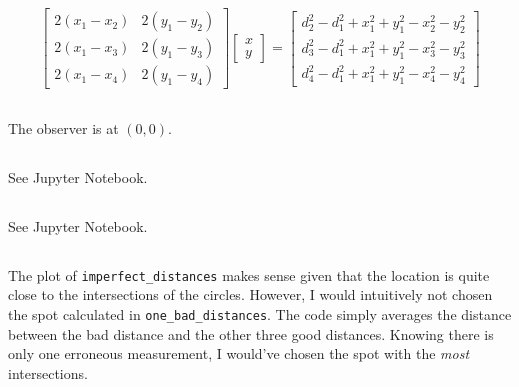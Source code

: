 \documentclass[]{article}
\begin{document}
\subsection{}

\begin{equation}
	\begin{bmatrix}
	2(x_1 - x_2) & 2(y_1 - y_2) \\
	2(x_1 - x_3) & 2(y_1 - y_3) \\
	2(x_1 - x_4) & 2(y_1 - y_4)
	\end{bmatrix}
	\begin{bmatrix}
	x \\
	y
	\end{bmatrix}
	=
	\begin{bmatrix}
	d_2^2 - d_1^2 + x_1^2 + y_1^2 - x_2^2 - y_2^2 \\
	d_3^2 - d_1^2 + x_1^2 + y_1^2 - x_3^2 - y_3^2 \\
	d_4^2 - d_1^2 + x_1^2 + y_1^2 - x_4^2 - y_4^2
	\end{bmatrix}
\end{equation}

\subsection{}

The observer is at \((0, 0)\). 

\subsection{}

See Jupyter Notebook. 

\subsection{}

See Jupyter Notebook. 

\subsection{}

The plot of \texttt{imperfect\_distances} makes sense given that the location is quite close to the intersections of the circles. 
However, I would intuitively not chosen the spot calculated in \texttt{one\_bad\_distances}. 
The code simply averages the distance between the bad distance and the other three good distances. 
Knowing there is only one erroneous measurement, I would've chosen the spot with the \emph{most} intersections. 
\end{document}

